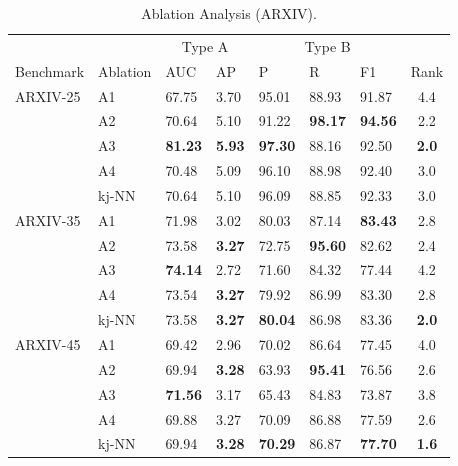 \begin{table}
	\caption{Ablation Analysis (ARXIV).}
	\label{tab:ablation_arxiv}
	\renewrobustcmd{\boldmath}{}
	\addtolength{\tabcolsep}{-2pt}
	\centering
	\footnotesize
	\renewcommand{\arraystretch}{0.55}
	\begin{tabularx}{\columnwidth}{XXXXXXX|c}
		&       &  \multicolumn{2}{c|}{Type A }  &    \multicolumn{3}{c}{Type B}   &  \xrowht{8pt}  \\ \cline{3-4}\cline{5-7}
		Benchmark          &    Ablation   & \gls{AUC}    & \gls{AP}    & P      & R           & F1    & Rank\xrowht{8pt}  \\  \toprule 
		ARXIV-25 & A1    & 67.75  & 3.70  & 95.01  & 88.93       & 91.87 & 4.4  \\
		& A2    & 70.64  & 5.10  & 91.22  & \bfseries98.17       & \bfseries94.56 & 2.2  \\
		& A3    & \bfseries81.23  & \bfseries5.93  & \bfseries97.30  & 88.16       & 92.50 & \bfseries2.0    \\
		& A4    & 70.48  & 5.09  & 96.10  & 88.98       & 92.40 & 3.0    \\
		& \gls{kj-NN} & 70.64  & 5.10  & 96.09  & 88.85       & 92.33 & 3.0    \\  \midrule
		ARXIV-35 & A1    & 71.98  & 3.02  & 80.03  & 87.14       & \bfseries83.43 & 2.8  \\
		& A2    & 73.58  & \bfseries3.27  & 72.75  & \bfseries95.60       & 82.62 & 2.4  \\
		& A3    & \bfseries74.14  & 2.72  & 71.60  & 84.32       & 77.44 & 4.2  \\
		& A4    & 73.54  & \bfseries3.27  & 79.92  & 86.99       & 83.30 & 2.8  \\
		& \gls{kj-NN} & 73.58  & \bfseries3.27  & \bfseries80.04  & 86.98       & 83.36 & \bfseries2.0    \\ \midrule
		ARXIV-45 & A1    & 69.42  & 2.96  & 70.02  & 86.64       & 77.45 & 4.0    \\
		& A2    & 69.94  & \bfseries3.28  & 63.93  & \bfseries95.41       & 76.56 & 2.6  \\
		& A3    & \bfseries71.56  & 3.17  & 65.43  & 84.83       & 73.87 & 3.8  \\
		& A4    & 69.88  & 3.27  & 70.09  & 86.88       & 77.59 & 2.6  \\
		& \gls{kj-NN} & 69.94  & \bfseries3.28  & \bfseries70.29  & 86.87       & \bfseries77.70 & \bfseries1.6  \\ \midrule

\end{tabularx}
\end{table}
